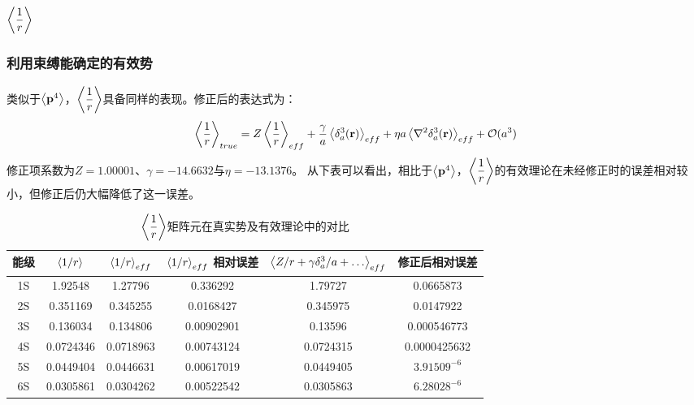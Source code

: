 \documentclass[hyperref,cs4size,titlepage,twoside]{ctexart}
\begin{document}
\subsection{$\displaystyle\expval{\frac{1}{r}}$}
\subsubsection{利用束缚能确定的有效势}
类似于$\expval{\vb{p}^4}$，$\displaystyle\expval{\frac{1}{r}}$具备同样的表现。修正后的表达式为：
\begin{equation}\label{rtrue}
  \expval{\frac{1}{r}}_{true}=Z\expval{\frac{1}{r}}_{eff}+\frac{\gamma}{a}\expval{\delta^3_a(\vb{r})}_{eff}+\eta a\expval{\laplacian{\delta^3_a(\vb{r})}}_{eff}+\mathcal{O}(a^3)
\end{equation}
修正项系数为$Z=1.00001$、$\gamma=-14.6632$与$\eta= -13.1376$。 从下表可以看出，相比于$\expval{\vb{p}^4}$，$\displaystyle\expval{\frac{1}{r}}$的有效理论在未经修正时的误差相对较小，但修正后仍大幅降低了这一误差。
\begin{table}[!hbtp]
  \centering
  \begin{tabular}{|cccccc|}
    \hline
    能级 & $\expval{1/r}$ & $\expval{1/r}_{eff}$ & $\expval{1/r}_{eff}$ 相对误差& $\expval{Z/r+\gamma \delta^3_a/a+\dots}_{eff}$ & 修正后相对误差 \\
    \hline
    1S & 1.92548 & 1.27796 &0.336292& 1.79727&0.0665873 \\
    2S & 0.351169 & 0.345255 &0.0168427& 0.345975&0.0147922 \\
    3S & 0.136034 & 0.134806 &0.00902901& 0.13596&0.000546773 \\
    4S & 0.0724346 & 0.0718963 &0.00743124& 0.0724315&0.0000425632 \\
    5S & 0.0449404 & 0.0446631 &0.00617019& 0.0449405&$3.91509^{-6}$ \\
    6S & 0.0305861 & 0.0304262 &0.00522542& 0.0305863&$6.28028^{-6}$ \\
    \hline
  \end{tabular}
  \caption{$\displaystyle\expval{\frac{1}{r}}$矩阵元在真实势及有效理论中的对比}\label{evr}
\end{table}
\end{document}
